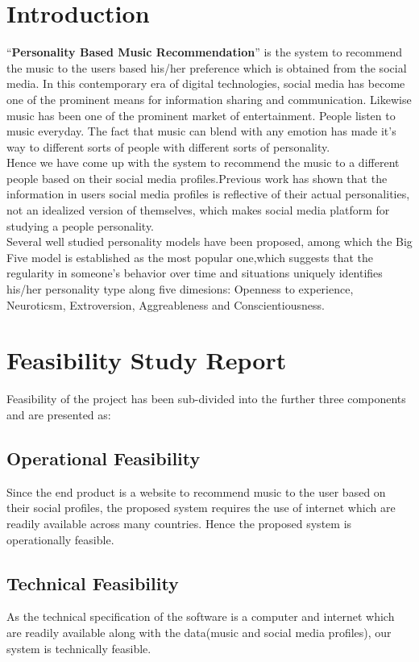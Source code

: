 \documentclass[a4paper,12pt]{article}
\begin{document}
\section{Introduction}
	``\textbf{Personality Based Music Recommendation}'' is the system to recommend the music to the users based his/her preference which is obtained from the social media. In this contemporary era of digital technologies, social media has become one of the prominent means for information sharing and communication. Likewise music has been one of the prominent market of entertainment. People listen to music everyday. The fact that music can blend with any emotion has made it's way to different sorts of people with different sorts of personality.\\
	Hence we have come up with the system to recommend the music to a different people based on their social media profiles.Previous work has shown that the information in users social media profiles is reflective of their actual personalities, not an idealized version of themselves, which makes social media platform for studying a people personality.\\
	Several well studied personality models have been proposed, among which the Big Five model is established as the most popular one,which suggests that the regularity in someone's behavior over time and situations uniquely identifies his/her personality type along five dimesions: Openness to experience, Neuroticsm, Extroversion, Aggreableness and Conscientiousness.
\cleardoublepage

\section{Feasibility Study Report}
	Feasibility of the project has been sub-divided into the further three components and are presented as:\\
	\subsection{Operational Feasibility}
	Since the end product is a website to recommend music to the user based on their social profiles, the proposed system requires the use of internet which are readily available across many countries. Hence the proposed system is operationally feasible.
	\subsection{Technical Feasibility}
	As the technical specification of the software is a computer and internet which are readily available along with the data(music and social media profiles), our system is technically feasible.
\end{document}
